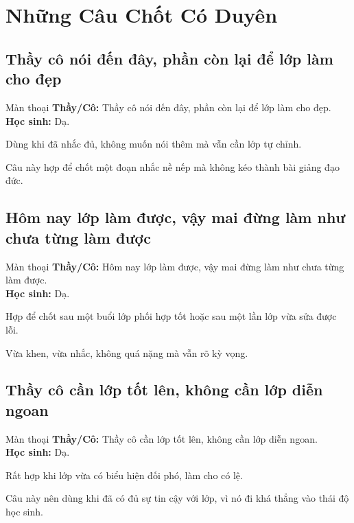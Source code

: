 \chapter{Những Câu Chốt Có Duyên}

\section{Thầy cô nói đến đây, phần còn lại để lớp làm cho đẹp}
\begin{manthoai}{Màn thoại}
\textbf{Thầy/Cô:} Thầy cô nói đến đây, phần còn lại để lớp làm cho đẹp.\\
\textbf{Học sinh:} Dạ.
\end{manthoai}
\begin{dungkhinào}
Dùng khi đã nhắc đủ, không muốn nói thêm mà vẫn cần lớp tự chỉnh.
\end{dungkhinào}
\begin{nhipthem}
Câu này hợp để chốt một đoạn nhắc nề nếp mà không kéo thành bài giảng đạo đức.
\end{nhipthem}
\ngancach

\section{Hôm nay lớp làm được, vậy mai đừng làm như chưa từng làm được}
\begin{manthoai}{Màn thoại}
\textbf{Thầy/Cô:} Hôm nay lớp làm được, vậy mai đừng làm như chưa từng làm được.\\
\textbf{Học sinh:} Dạ.
\end{manthoai}
\begin{dungkhinào}
Hợp để chốt sau một buổi lớp phối hợp tốt hoặc sau một lần lớp vừa sửa được lỗi.
\end{dungkhinào}
\begin{nhipthem}
Vừa khen, vừa nhắc, không quá nặng mà vẫn rõ kỳ vọng.
\end{nhipthem}
\ngancach

\section{Thầy cô cần lớp tốt lên, không cần lớp diễn ngoan}
\begin{manthoai}{Màn thoại}
\textbf{Thầy/Cô:} Thầy cô cần lớp tốt lên, không cần lớp diễn ngoan.\\
\textbf{Học sinh:} Dạ.
\end{manthoai}
\begin{dungkhinào}
Rất hợp khi lớp vừa có biểu hiện đối phó, làm cho có lệ.
\end{dungkhinào}
\begin{nhipthem}
Câu này nên dùng khi đã có đủ sự tin cậy với lớp, vì nó đi khá thẳng vào thái độ học sinh.
\end{nhipthem}
\ngancach

